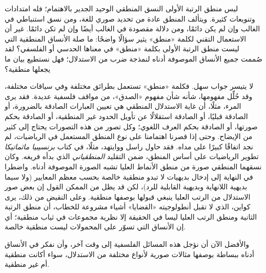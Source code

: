 \documentclass[../../../include/open-logic-section]{subfiles}
\begin{document}


ليس منطق الرتبة الأولى النسق المنطقي الوحيد الجدير بالاهتمام؛ فله
امتدادات وتنويعات كثيرة. ويتألف المنطق عادة من تحديد صوري للغة، ومن
نسق استنباطي في الغالب وإن لم يكن دائمًا، ومن دلالة مقصودة في الغالب
أيضًا وإن لم تكن دائمًا. غير أن الاستعمال التقني لكلمة «منطق» يثير
سؤالًا واضحًا: ما صلة الأنساق المنطقية التي ليست منطق الرتبة الأولى
بكلمة «منطق» في معناها الحدسي أو الفلسفي؟ لقد صُممت جميع الأنساق
الموصوفة أدناه لنمذجة ضرب من الاستدلال؛ فهل نستطيع بيان ما يجعلها
منطقية؟

لا يتيسر جواب سهل. فكلمة «منطق» تستعمل بطرائق مختلفة وفي سياقات
مختلفة، وقد حُلِّل مفهومها، شأنه شأن مفهوم «الصدق»، من مواقف فلسفية
عديدة. فقد يرى المرء، مثلًا، أن غاية الاستدلال المنطقي هي تعيين
العبارات الصادقة بالضرورة، أو الصادقة قبليًا، أو الصادقة استقلالًا عن
تأويل الحدود غير المنطقية، أو الصادقة بحكم صورتها، أو الصادقة بحكم
العرف اللغوي؛ وكل تصور من هذه التصورات يحتاج إلى كثير من الإيضاح. وحتى
إذا قصرنا اهتمامنا على نوع المنطق المستعمل في الرياضيات، لم نجد اتفاقًا
كبيرًا على مداه. فقد حاول راسل ووايتهد، مثلًا، في كتاب
\textit{برنسيبيا ماثماتيكا} تطوير الرياضيات على أساس المنطق، ضمن
التقليد {\em المنطقياني} الذي بدأه فريغه. وكان نسقهما المنطقي صورة من
منطق الأنماط العليا تشبه الصورة الموصوفة أدناه. واضطرا في النهاية إلى
إدخال بديهيات لا تبدو منطقية خالصة بحسب معظم المعايير (ولا سيما بديهية
اللانهاية وبديهية القابلية للرد)، لكن قد يظل من الممكن القول إن بعض
صور الاستدلال من الرتب العليا ينبغي قبولها بوصفها منطقية. وعلى النقيض
من ذلك، يرى كواين، الذي لا تقبل أنطولوجيته «القضايا» أشياء مشروعة
للخطاب، أن منطق الرتبة الثانية ومنطق الرتب العليا ليسا في الحقيقة إلا
نظرية مجموعات في ثياب منطقية؛ أي إن الأنساق التي تسوّر على المحمولات
ليست منطقية خالصة.

والأفضل الآن أن نؤجل هذه المسائل الفلسفية إلى وقت آخر، وأن نفكر في
الأنساق أدناه ببساطة بوصفها مثالات صورية لأنواع مختلفة من الاستدلال،
سواء أكانت منطقية أم غير منطقية.
\end{document}
